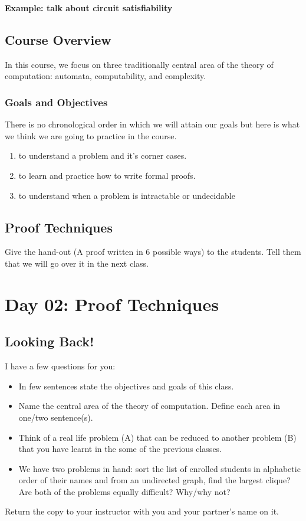 \documentclass[11pt, oneside]{article}   	%
\begin{document}
{\bf Example: talk about circuit satisfiability}
 
\subsection{Course Overview}
In this course, we focus on three traditionally central area of the theory of computation: automata, computability, and complexity.

\subsubsection{Goals and Objectives}
There is no chronological order in which we will attain our goals but here is what we think we are going to practice in the course.
\begin{enumerate}
\item to understand a problem and it's corner cases.
\item to learn and practice how to write formal proofs.
\item to understand when a problem is intractable or undecidable
\end{enumerate}


\subsection{Proof Techniques}
Give the hand-out (A proof written in 6 possible ways) to the students. Tell them that we will go over it in the next class.

\section{Day 02: Proof Techniques}

\subsection{Looking Back!}
I have a few questions for you:
\begin{itemize}[noitemsep, nolistsep]
\item In few sentences state the objectives and goals of this class.
\item Name the central area of the theory of computation. Define each area in one/two sentence(s).
\item Think of a real life problem (A) that can be reduced to another problem (B) that you have learnt in the some of the previous classes.
\item We have two problems in hand: sort the list of enrolled students in alphabetic order of their names and from an undirected graph, find the largest clique? Are both of the problems equally difficult? Why/why not?
\end{itemize}
Return the copy to your instructor with you and your partner's name on it.
\end{document}
